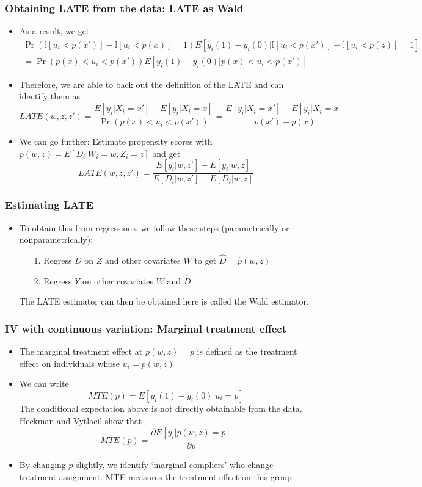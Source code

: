 \documentclass[aspectratio=169]{beamer}
\begin{document}
\begin{frame}
\frametitle{Obtaining LATE from the data: LATE as Wald}
\begin{itemize}
\item As a result, we get 
\begin{gather*}
\Pr(\mathbb{I}[u_i<p(x')]-\mathbb{I}[u_i<p(x)]=1)E[y_i(1)-y_i(0)|\mathbb{I}[u_i<p(x')]-\mathbb{I}[u_i<p(z)]=1]\\
=\Pr(p(x)<u_i<p(x'))E[y_i(1)-y_i(0)|p(x)<u_i<p(x')]
\end{gather*}
\item Therefore, we are able to back out the definition of the LATE and can identify them as
\[
LATE(w, z, z')=\frac{E[y_i|X_i=x']-E[y_i|X_i=x]}{\Pr(p(x)<u_i<p(x'))}=\frac{E[y_i|X_i=x']-E[y_i|X_i=x]}{p(x')-p(x)}
\]
\item We can go further: Estimate propensity scores with $p(w,z)=E[D_i|W_i=w, Z_i=z]$ and get
\[
LATE(w, z, z')=\frac{E[y_i|w, z']-E[y_i|w, z]}{E[D_i|w, z']-E[D_i|w, z]}
\]
\end{itemize}
\end{frame}

\begin{frame}
\frametitle{Estimating LATE}
\begin{itemize}
\item To obtain this from regressions, we follow these steps (parametrically or nonparametrically):
\begin{itemize}
\item[1.] Regress $D$ on $Z$ and other covariates $W$ to get $\widehat{D}=\hat{p}(w,z)$
\item[2.] Regress $Y$ on other covariates $W$ and $\widehat{D}$.
\end{itemize}
The LATE estimator can then be obtained here is called the Wald estimator. 
\end{itemize}
\end{frame}


\begin{frame}
\frametitle{IV with continuous variation: Marginal treatment effect}
\begin{itemize}
\item The marginal treatment effect at $p(w,z)=p$ is defined as the treatment effect on individuals whose $u_i=p(w,z)$
\item We can write
\[
MTE(p)=E[y_i(1)-y_i(0)| u_i=p]
\]
The conditional expectation above is not directly obtainable from the data. Heckman and Vytlacil show that 
\[
MTE(p)=\frac{\partial E[y_i | p(w,z)=p]}{\partial p}
\]
\item By changing $p$ slightly, we identify `marginal compliers' who change treatment assignment. MTE measures the treatment effect on this group
\end{itemize}
\end{frame}
\end{document}
